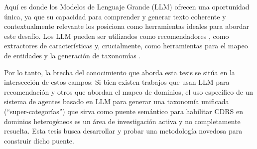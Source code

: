 Aquí es donde los Modelos de Lenguaje Grande (LLM) ofrecen una oportunidad única, ya que su capacidad para comprender y generar texto coherente y contextualmente relevante los posiciona como herramientas ideales para abordar este desafío. Los LLM pueden ser utilizados como recomendadores \cite{DBLP:journals/corr/abs-2303-14524}, como extractores de características \cite{DBLP:journals/corr/abs-2404-05961} y, crucialmente, como herramientas para el mapeo de entidades \cite{1360021396355430528} y la generación de taxonomías \cite{10.1145/3219819.3220064}.

Por lo tanto, la brecha del conocimiento que aborda esta tesis se sitúa en la intersección de estos campos: Si bien existen trabajos que usan LLM para recomendación \cite{10506571} y otros que abordan el mapeo de dominios, el uso específico de un sistema de agentes basado en LLM para generar una taxonomía unificada (\enquote{super-categorías}) que sirva como puente semántico para habilitar CDRS en dominios heterogéneos es un área de investigación activa y no completamente resuelta. Esta tesis busca desarrollar y probar una metodología novedosa para construir dicho puente.
